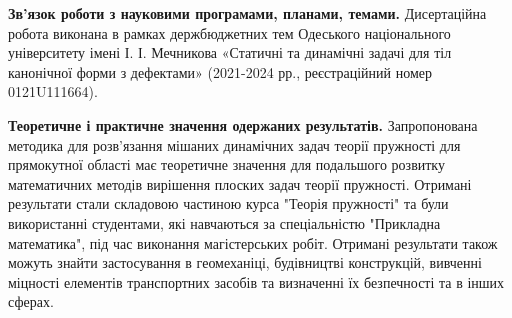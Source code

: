 \textbf{Зв’язок роботи з науковими програмами, планами, темами.}
Дисертаційна робота виконана в рамках держбюджетних тем Одеського національного університету імені І. І. Мечникова
«Статичні та динамічні задачі для тіл канонічної форми з дефектами»
(2021-2024 рр., реєстраційний номер 0121U111664).

\textbf{Теоретичне і практичне значення одержаних результатів.} 
Запропонована методика для розв'язання мішаних динамічних задач теорії пружності для прямокутної області має теоретичне значення для подальшого розвитку математичних методів вирішення плоских задач теорії пружності.
Отримані результати стали складовою частиною курса "Теорія пружності" та були використанні студентами, які навчаються за спеціальністю "Прикладна математика", під час виконання магістерських робіт.
Отримані результати також можуть знайти застосування в геомеханіці, будівництві конструкцій, вивченні міцності елементів транспортних засобів та визначенні їх безпечності та в інших сферах.
